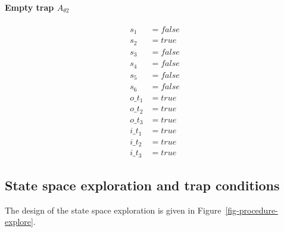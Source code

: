 \documentclass{article}
\begin{document}
\paragraph{Empty trap $A_{\theta 2}$}
\begin{align*}
  s_1 &= false \\
  s_2 &= true \\
  s_3 &= false \\
  s_4 &= false \\
  s_5 &= false \\
  s_6 &= false \\
  o\_t_1 &= true \\
  o\_t_2 &= true \\
  o\_t_3 &= true \\
  i\_t_1 &= true \\
  i\_t_2 &= true \\
  i\_t_3 &= true
\end{align*}

\subsection{State space exploration and trap conditions}

The design of the state space exploration is given in Figure~\ref{fig-procedure-explore}.


\end{document}
